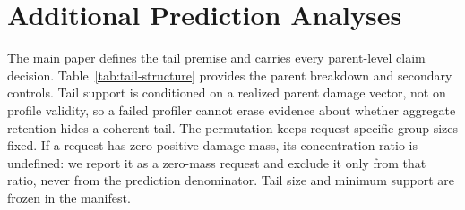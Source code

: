 \FloatBarrier

\section{Additional Prediction Analyses}
\label{app:prediction-supp}

The main paper defines the tail premise and carries every parent-level claim
decision. Table~\ref{tab:tail-structure} provides the parent breakdown and
secondary controls. Tail support is conditioned on a realized parent damage
vector, not on profile validity, so a failed profiler cannot erase evidence
about whether aggregate retention hides a coherent tail. The permutation
keeps request-specific group sizes fixed. If a request has zero positive
damage mass, its concentration ratio is undefined: we report it as a
zero-mass request and exclude it only from that ratio, never from the
prediction denominator. Tail size and minimum support are frozen in the
manifest.

